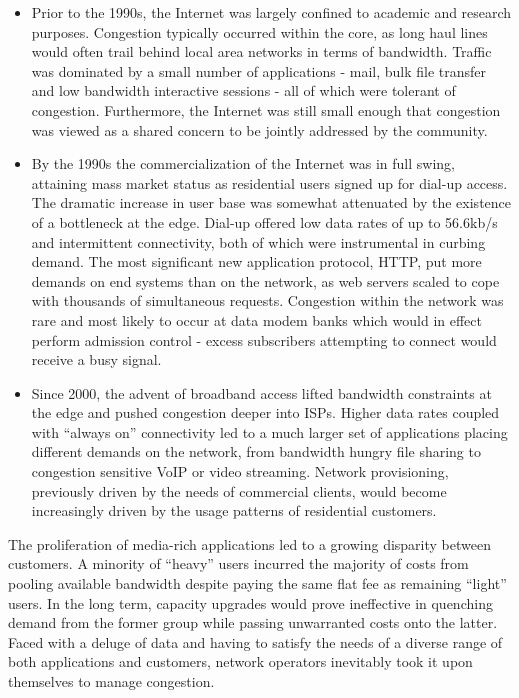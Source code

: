 \begin{itemize}
    \item{Prior to the 1990s, the Internet was largely confined to academic and research purposes. 
        Congestion typically occurred within the core, as long haul lines would often trail behind local area networks in terms of bandwidth. 
        Traffic was dominated by a small number of applications - mail, bulk file transfer and low bandwidth interactive sessions - all of which were tolerant of congestion.
        Furthermore, the Internet was still small enough that congestion was viewed as a shared concern to be jointly addressed by the community.
    }
    \item{By the 1990s the commercialization of the Internet was in full swing, attaining mass market status as residential users signed up for dial-up access.
    The dramatic increase in user base was somewhat attenuated by the existence of a bottleneck at the edge.
    Dial-up offered low data rates of up to 56.6kb/s and intermittent connectivity, both of which were instrumental in curbing demand.
    The most significant new application protocol, \ac{HTTP}, put more demands on end systems than on the network, as web servers scaled to cope with thousands of simultaneous requests.
    Congestion within the network was rare and most likely to occur at data modem banks which would in effect perform admission control - excess subscribers attempting to connect would receive a busy signal.
    }
    \item{Since 2000, the advent of broadband access lifted bandwidth constraints at the edge and pushed congestion deeper into \acp{ISP}.
            Higher data rates coupled with ``always on'' connectivity led to a much larger set of applications placing different demands on the network, from bandwidth hungry file sharing to congestion sensitive \ac{VoIP} or video streaming.
    Network provisioning, previously driven by the needs of commercial clients, would become increasingly driven by the usage patterns of residential customers. 
    }
\end{itemize}

The proliferation of media-rich applications led to a growing disparity between customers.
A minority of ``heavy'' users incurred the majority of costs from pooling available bandwidth despite paying the same flat fee as remaining ``light'' users.
In the long term, capacity upgrades would prove ineffective in quenching demand from the former group while passing unwarranted costs onto the latter.
Faced with a deluge of data and having to satisfy the needs of a diverse range of both applications and customers, network operators inevitably took it upon themselves to manage congestion.

